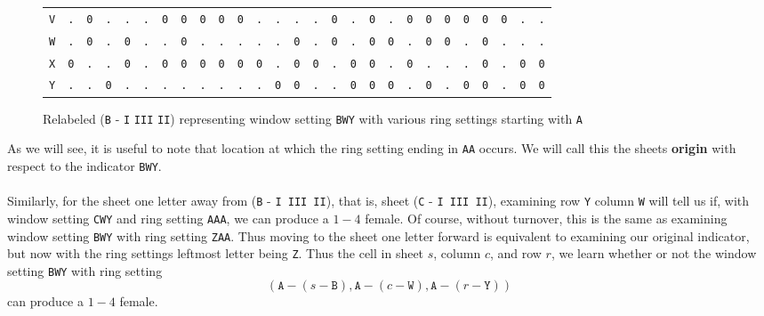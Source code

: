 \begin{figure}[H]
\begin{center}
{\begin{tabular}{c|cccccccccccccccccccccccccc}
				\texttt{V} & \texttt{.} & \texttt{0} & \texttt{.} &
				\texttt{.} & \texttt{.} & \texttt{0} & \texttt{0} &
				\texttt{0} & \texttt{0} & \texttt{0} & \texttt{.} &
				\texttt{.} & \texttt{.} & \texttt{.} & \texttt{0} &
				\texttt{.} & \texttt{0} & \texttt{.} & \texttt{0} &
				\texttt{0} & \texttt{0} & \texttt{0} & \texttt{0} &
				\texttt{0} & \texttt{.} & \texttt{.}                             \\
				\texttt{W} & \texttt{.} & \texttt{0} & \texttt{.} &
				\texttt{0} & \texttt{.} & \texttt{.} & \texttt{0} &
				\texttt{.} & \texttt{.} & \texttt{.} & \texttt{.} &
				\texttt{.} & \texttt{0} & \texttt{.} & \texttt{0} &
				\texttt{.} & \texttt{0} & \texttt{0} & \texttt{.} &
				\texttt{0} & \texttt{0} & \texttt{.} & \texttt{0} &
				\texttt{.} & \texttt{.} & \texttt{.}                             \\
				\texttt{X} & \texttt{0} & \texttt{.} & \texttt{.} &
				\texttt{0} & \texttt{.} & \texttt{0} & \texttt{0} &
				\texttt{0} & \texttt{0} & \texttt{0} & \texttt{0} &
				\texttt{.} & \texttt{0} & \texttt{0} & \texttt{.} &
				\texttt{0} & \texttt{0} & \texttt{.} & \texttt{0} &
				\texttt{.} & \texttt{.} & \texttt{.} & \texttt{0} &
				\texttt{.} & \texttt{0} & \texttt{0}                             \\
				\texttt{Y} & \texttt{.} & \texttt{.} & \texttt{0} &
				\texttt{.} & \texttt{.} & \texttt{.} & \texttt{.} &
				\texttt{.} & \texttt{.} & \texttt{.} & \texttt{.} &
				\texttt{0} & \texttt{0} & \texttt{.} & \texttt{.} &
				\texttt{0} & \texttt{0} & \texttt{0} & \texttt{.} &
				\texttt{0} & \texttt{.} & \texttt{0} & \texttt{0} &
				\texttt{.} & \texttt{0} & \texttt{0}                             \\
			\end{tabular}}
	\end{center}
	\caption{Relabeled (\texttt{B} - \texttt{I} \texttt{III}
		\texttt{II}) representing window setting \texttt{BWY} with various
		ring settings starting with \texttt{A}}
	\label{fig:zygalski_sheet_ring}
\end{figure}
\noindent As we will see, it is useful to note that location at which
the ring setting ending in \texttt{AA} occurs. We will call this the
sheets {\bf{origin}} with respect to the indicator \texttt{BWY}.
\\\\Similarly, for the sheet one letter away from (\texttt{B} -
\texttt{I III II}), that is, sheet (\texttt{C} - \texttt{I III II}),
examining row \texttt{Y} column \texttt{W} will tell us if, with
window setting \texttt{CWY} and ring setting \texttt{AAA}, we can
produce a $1-4$ female. Of course, without turnover, this is the same
as examining window setting \texttt{BWY} with ring setting
\texttt{ZAA}. Thus moving to the sheet one letter forward is
equivalent to examining our original indicator, but now with the ring
settings leftmost letter being \texttt{Z}. Thus the cell in sheet
$s$, column $c$, and row $r$, we learn whether or not the window
setting \texttt{BWY} with ring setting
\[
	(\texttt{A} - (s - \texttt{B}), \texttt{A} - (c -\texttt{W}),
	\texttt{A} - (r -\texttt{Y}))
\]
can produce a $1-4$ female.

